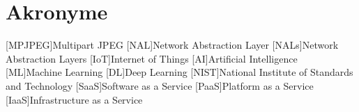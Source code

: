 {}
\chapter*{Akronyme}

\begin{acronym}[MPJPEG]
    [MPJPEG]{Multipart JPEG}
    [NAL]{Network Abstraction Layer}
    [NALs]{Network Abstraction Layers}
    [IoT]{Internet of Things}
    [AI]{Artificial Intelligence}
    [ML]{Machine Learning}
    [DL]{Deep Learning}
    [NIST]{National Institute of Standards and Technology}
    [SaaS]{Software as a Service}
    [PaaS]{Platform as a Service}
    [IaaS]{Infrastructure as a Service}
\end{acronym}

